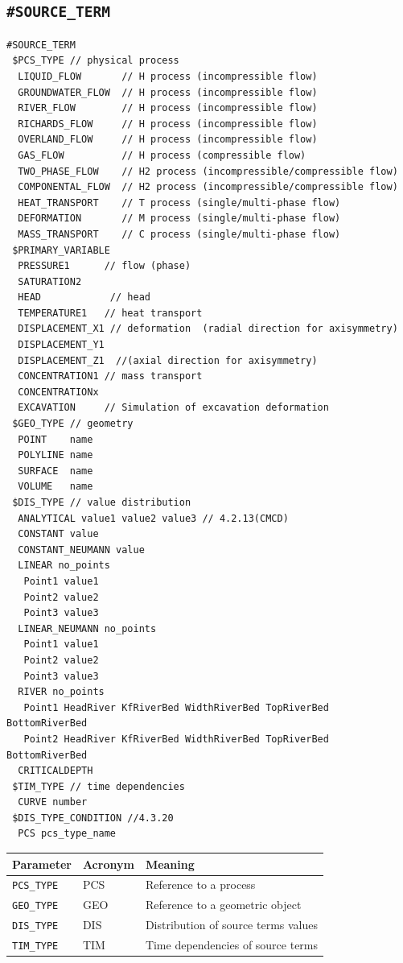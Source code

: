 \subsection{\texttt{\bf\#SOURCE\_TERM}}
\label{sec:st}

\begin{verbatim}
#SOURCE_TERM
 $PCS_TYPE // physical process
  LIQUID_FLOW       // H process (incompressible flow)
  GROUNDWATER_FLOW  // H process (incompressible flow)
  RIVER_FLOW        // H process (incompressible flow)
  RICHARDS_FLOW     // H process (incompressible flow)
  OVERLAND_FLOW     // H process (incompressible flow)
  GAS_FLOW          // H process (compressible flow)
  TWO_PHASE_FLOW    // H2 process (incompressible/compressible flow)
  COMPONENTAL_FLOW  // H2 process (incompressible/compressible flow)
  HEAT_TRANSPORT    // T process (single/multi-phase flow)
  DEFORMATION       // M process (single/multi-phase flow)
  MASS_TRANSPORT    // C process (single/multi-phase flow)
 $PRIMARY_VARIABLE
  PRESSURE1      // flow (phase)
  SATURATION2
  HEAD            // head
  TEMPERATURE1   // heat transport
  DISPLACEMENT_X1 // deformation  (radial direction for axisymmetry)
  DISPLACEMENT_Y1
  DISPLACEMENT_Z1  //(axial direction for axisymmetry)
  CONCENTRATION1 // mass transport
  CONCENTRATIONx
  EXCAVATION     // Simulation of excavation deformation
 $GEO_TYPE // geometry
  POINT    name
  POLYLINE name
  SURFACE  name
  VOLUME   name
 $DIS_TYPE // value distribution
  ANALYTICAL value1 value2 value3 // 4.2.13(CMCD)
  CONSTANT value
  CONSTANT_NEUMANN value
  LINEAR no_points
   Point1 value1
   Point2 value2
   Point3 value3
  LINEAR_NEUMANN no_points
   Point1 value1
   Point2 value2
   Point3 value3
  RIVER no_points
   Point1 HeadRiver KfRiverBed WidthRiverBed TopRiverBed BottomRiverBed
   Point2 HeadRiver KfRiverBed WidthRiverBed TopRiverBed BottomRiverBed
  CRITICALDEPTH
 $TIM_TYPE // time dependencies
  CURVE number
 $DIS_TYPE_CONDITION //4.3.20
  PCS pcs_type_name
\end{verbatim}


\begin{tabular*}{12.773cm}{|p{}|p{1.5cm}|p{7cm}|} \hline
Parameter          & Acronym & Meaning \\ \hline \hline
%
\texttt{PCS\_TYPE} & PCS &  Reference to a process \\
\texttt{GEO\_TYPE} & GEO &  Reference to a geometric object \\
\texttt{DIS\_TYPE} & DIS &  Distribution of source terms values \\
\texttt{TIM\_TYPE} & TIM &  Time dependencies of source terms \\
\hline
\end{tabular*}

